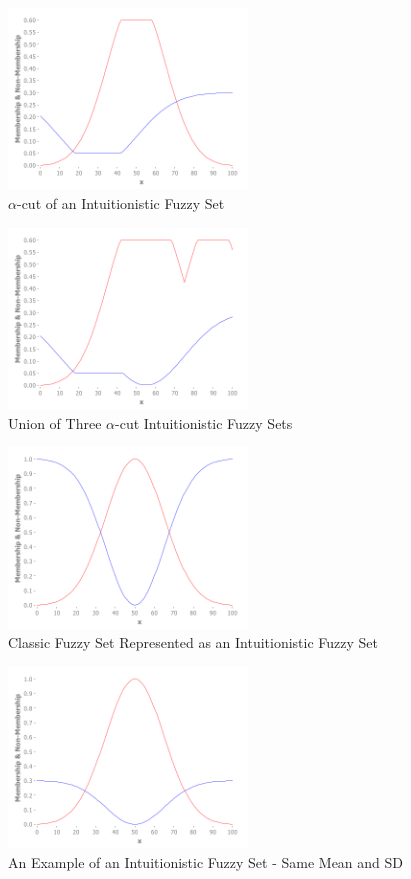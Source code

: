 \documentclass[conference]{IEEEtran}
\begin{document}
\begin{figure}[!t]
  \centering
  \includegraphics[width=2.5in]{alpha-cut}
  \caption{$\alpha$-cut of an Intuitionistic Fuzzy Set}
  \label{alpha-cut}
\end{figure}

\begin{figure}[!t]
  \centering
  \includegraphics[width=2.5in]{ifs-union}
  \caption{Union of Three $\alpha$-cut Intuitionistic Fuzzy Sets}
  \label{ifs-union}
\end{figure}

\begin{figure}[!t]
  \centering
  \includegraphics[width=2.5in]{fs-as-ifs}
  \caption{Classic Fuzzy Set Represented as an Intuitionistic Fuzzy Set}
  \label{fs-as-ifs}
\end{figure}

\begin{figure}[!t]
  \centering
  \includegraphics[width=2.5in]{ifs}
  \caption{An Example of an Intuitionistic Fuzzy Set - Same Mean and SD}
  \label{ifs}
\end{figure}
\end{document}
